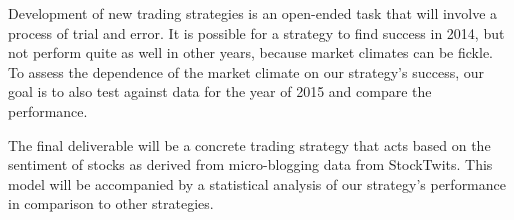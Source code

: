 Development of new trading strategies is an open-ended task that will involve a process of trial and error.
It is possible for a strategy to find success in 2014, but not perform quite as well in other years, because market climates can be fickle.
To assess the dependence of the market climate on our strategy's success, our goal is to also test against data for the year of 2015 and compare the performance.

The final deliverable will be a concrete trading strategy that acts based on the sentiment of stocks as derived from micro-blogging data from StockTwits.
This model will be accompanied by a statistical analysis of our strategy's performance in comparison to other strategies.

